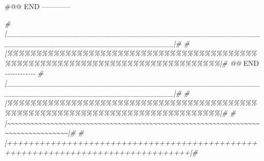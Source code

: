 \documentclass[
]{article}
\newenvironment{Shaded}{\begin{snugshade}}{\end{snugshade}}
\newcommand{\CommentTok}[1]{\textcolor[rgb]{0.56,0.35,0.01}{\textit{#1}}}
\newcommand{\RegionMarkerTok}[1]{#1}
\begin{document}
\#@@ END ------------

\begin{Shaded}
\begin{Highlighting}[]
\CommentTok{\# |\_\_\_\_\_\_\_\_\_\_\_\_\_\_\_\_\_\_\_\_\_\_\_\_\_\_\_\_\_\_\_\_\_\_\_\_\_\_\_\_\_\_\_\_\_\_\_\_\_\_\_\_\_\_\_\_\_\_\_\_\_\_\_\_\_\_\_\_\_\_\_\_\_\_\_\_\_\_\_\_|\#}
\CommentTok{\# |\%\%\%\%\%\%\%\%\%\%\%\%\%\%\%\%\%\%\%\%\%\%\%\%\%\%\%\%\%\%\%\%\%\%\%\%\%\%\%\%\%\%\%\%\%\%\%\%\%\%\%\%\%\%\%\%\%\%\%\%\%\%\%\%\%\%\%\%\%\%\%\%\%\%\%\%\%\%\%\%|\# @@ }\RegionMarkerTok{END}\CommentTok{ {-}{-}{-}{-}{-}{-}{-}{-}{-}{-}{-}{-}}
\CommentTok{\# |\_\_\_\_\_\_\_\_\_\_\_\_\_\_\_\_\_\_\_\_\_\_\_\_\_\_\_\_\_\_\_\_\_\_\_\_\_\_\_\_\_\_\_\_\_\_\_\_\_\_\_\_\_\_\_\_\_\_\_\_\_\_\_\_\_\_\_\_\_\_\_\_\_\_\_\_\_\_\_\_|\#}
\CommentTok{\# |\%\%\%\%\%\%\%\%\%\%\%\%\%\%\%\%\%\%\%\%\%\%\%\%\%\%\%\%\%\%\%\%\%\%\%\%\%\%\%\%\%\%\%\%\%\%\%\%\%\%\%\%\%\%\%\%\%\%\%\%\%\%\%\%\%\%\%\%\%\%\%\%\%\%\%\%\%\%\%\%|\#}
\CommentTok{\# |\textasciitilde{}\textasciitilde{}\textasciitilde{}\textasciitilde{}\textasciitilde{}\textasciitilde{}\textasciitilde{}\textasciitilde{}\textasciitilde{}\textasciitilde{}\textasciitilde{}\textasciitilde{}\textasciitilde{}\textasciitilde{}\textasciitilde{}\textasciitilde{}\textasciitilde{}\textasciitilde{}\textasciitilde{}\textasciitilde{}\textasciitilde{}\textasciitilde{}\textasciitilde{}\textasciitilde{}\textasciitilde{}\textasciitilde{}\textasciitilde{}\textasciitilde{}\textasciitilde{}\textasciitilde{}\textasciitilde{}\textasciitilde{}\textasciitilde{}\textasciitilde{}\textasciitilde{}\textasciitilde{}\textasciitilde{}\textasciitilde{}\textasciitilde{}\textasciitilde{}\textasciitilde{}\textasciitilde{}\textasciitilde{}\textasciitilde{}\textasciitilde{}\textasciitilde{}\textasciitilde{}\textasciitilde{}\textasciitilde{}\textasciitilde{}\textasciitilde{}\textasciitilde{}\textasciitilde{}\textasciitilde{}\textasciitilde{}\textasciitilde{}\textasciitilde{}\textasciitilde{}\textasciitilde{}\textasciitilde{}\textasciitilde{}\textasciitilde{}\textasciitilde{}\textasciitilde{}\textasciitilde{}\textasciitilde{}\textasciitilde{}\textasciitilde{}\textasciitilde{}\textasciitilde{}\textasciitilde{}\textasciitilde{}\textasciitilde{}\textasciitilde{}\textasciitilde{}\textasciitilde{}\textasciitilde{}\textasciitilde{}\textasciitilde{}\textasciitilde{}|\#}
\CommentTok{\# |++++++++++++++++++++++++++++++++++++++++++++++++++++++++++++++++++++++++++++++++|\#}

\end{Highlighting}
\end{Shaded}
\end{document}
